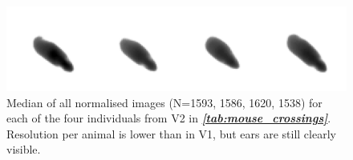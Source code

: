 \documentclass[9pt,lineno]{elife}
\newcommand{\tableref}[1]{\textit{\textbf{\ref{tab:#1}}}\xspace}
\begin{document}
\begin{figure}
\begin{fullwidth}
\includegraphics[width=1.0\linewidth]{mice_camera_image.pdf}
\caption{{\color{blue}Median of all normalised images (N=1593, 1586, 1620, 1538) for each of the four individuals from V2 in \tableref{mouse_crossings}. Resolution per animal is lower than in V1, but ears are still clearly visible.}}
\label{fig:mice_camera_image}
\end{fullwidth}
\end{figure}
\end{document}

